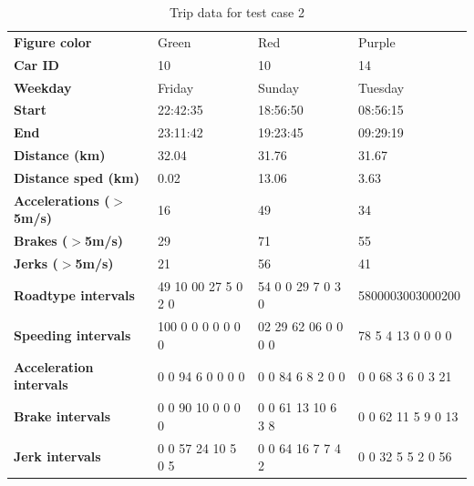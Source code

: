 \begin{table}
    \begin{tabular}{>{\bfseries}l|lll|}
    Figure color            & Green                & Red                 & Purple             \\
    Car ID                  & 10                   & 10                  & 14                 \\
    Weekday                 & Friday               & Sunday              & Tuesday            \\
    Start                   & 22:42:35             & 18:56:50            & 08:56:15           \\
    End                     & 23:11:42             & 19:23:45            & 09:29:19           \\
    Distance (km)           & 32.04                & 31.76               & 31.67              \\
    Distance sped (km)      & 0.02                 & 13.06               & 3.63               \\
    Accelerations ($>$5m/s) & 16                   & 49                  & 34                 \\
    Brakes ($>$5m/s)        & 29                   & 71                  & 55                 \\
    Jerks ($>$5m/s)         & 21                   & 56                  & 41                 \\
    Roadtype intervals      & 49 10 00 27 5  0 2 0 & 54 0 0 29 7 0 3 0   & 5800003003000200   \\
    Speeding intervals      & 100 0 0 0 0 0 0 0    & 02 29 62 06 0 0 0 0 & 78 5 4 13 0 0 0 0  \\
    Acceleration intervals  & 0 0 94 6 0 0 0 0     & 0 0 84 6 8 2 0 0    & 0 0 68 3 6 0 3 21  \\
    Brake intervals         & 0 0 90 10 0 0 0 0    & 0 0 61 13 10 6 3 8  & 0 0 62 11 5 9 0 13 \\
    Jerk intervals          & 0 0 57 24 10 5 0 5   & 0 0 64 16 7 7 4 2   & 0 0 32 5 5 2 0 56  \\
    \end{tabular}
    \caption{Trip data for test case 2}
    \label{tab:longtrips}
\end{table}

